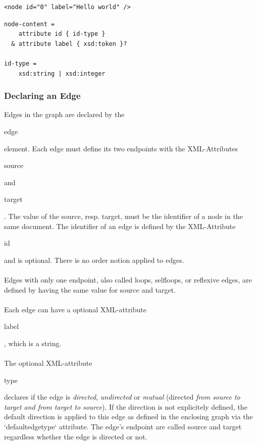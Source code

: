 \documentclass[a4paper,10pt]{article}
\begin{document}
\lstset{ style=gexf }
\begin{lstlisting}[caption={A node!},label=aNode]
<node id="0" label="Hello world" />
\end{lstlisting}

\lstset{ style=rnc }
\begin{lstlisting}[caption={Node Specification},label=nodeRNC]
node-content =
    attribute id { id-type }
  & attribute label { xsd:token }?

id-type =
    xsd:string | xsd:integer
\end{lstlisting}

\subsubsection{Declaring an Edge}

Edges in the graph are declared by the \begin{footnotesize}edge\end{footnotesize} element. Each edge must define its two endpoints with the XML-Attributes \begin{footnotesize}source\end{footnotesize} and \begin{footnotesize}target\end{footnotesize}. The value of the source, resp. target, must be the identifier of a node in the same document. The identifier of an edge is defined by the XML-Attribute \begin{footnotesize}id\end{footnotesize} and is optional. There is no order notion applied to edges.

\paragraph{}
Edges with only one endpoint, also called loops, selfloops, or reflexive edges, are defined by having the same value for source and target.

\paragraph{}
Each edge can have a optional XML-attribute \begin{footnotesize}label\end{footnotesize}, which is a string.

\paragraph{}
The optional XML-attribute \begin{footnotesize}type\end{footnotesize} declares if the edge is \textit{directed}, \textit{undirected} or \textit{mutual} (directed \textit{from source to target and from target to source}). If the direction is not explicitely defined, the default direction is applied to this edge as defined in the enclosing graph via the `defaultedgetype` attribute. The edge's endpoint are called source and target regardless whether the edge is directed or not.
\end{document}
